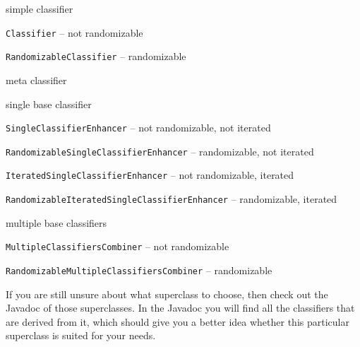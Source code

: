 \begin{tight_itemize}
  \item simple classifier
	\begin{tight_itemize}
	  \item \texttt{Classifier} -- not randomizable
	  \item \texttt{RandomizableClassifier} -- randomizable
	\end{tight_itemize}
  \item meta classifier
	\begin{tight_itemize}
	  \item single base classifier
		\begin{tight_itemize}
		  \item \texttt{SingleClassifierEnhancer} -- not randomizable, not
iterated
		  \item \texttt{RandomizableSingleClassifierEnhancer} -- randomizable,
not iterated
		  \item \texttt{IteratedSingleClassifierEnhancer} -- not randomizable,
iterated
		  \item \texttt{RandomizableIteratedSingleClassifierEnhancer} --
randomizable, iterated
		\end{tight_itemize}
	  \item multiple base classifiers
		\begin{tight_itemize}
		  \item \texttt{MultipleClassifiersCombiner} -- not randomizable
		  \item \texttt{RandomizableMultipleClassifiersCombiner} -- randomizable
		\end{tight_itemize}
	\end{tight_itemize}
\end{tight_itemize}
If you are still unsure about what superclass to choose, then check out the
Javadoc of those superclasses. In the Javadoc you will find all the classifiers
that are derived from it, which should give you a better idea whether this
particular superclass is suited for your needs.


